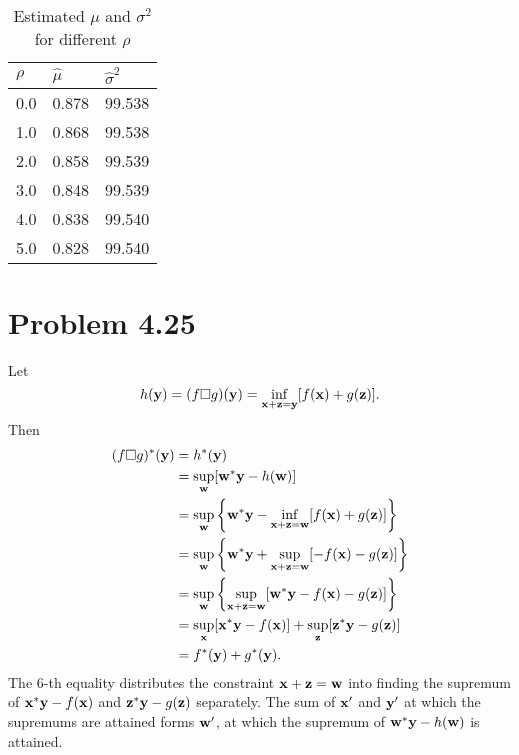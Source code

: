 \documentclass{scrartcl}
\begin{document}
\begin{table}[htb]
        \centering
        \begin{tabular}{| l | l | l |}
                \hline
                $\rho$ & $\hat{\mu}$ & $\hat{\sigma}^2$ \\ \hline
                0.0 & 0.878 & 99.538 \\ \hline
                1.0 & 0.868 & 99.538 \\ \hline
                2.0 & 0.858 & 99.539 \\ \hline
                3.0 & 0.848 & 99.539 \\ \hline
                4.0 & 0.838 & 99.540 \\ \hline
                5.0 & 0.828 & 99.540 \\ \hline
        \end{tabular}
        \caption{Estimated $\mu$ and $\sigma^2$ for different $\rho$}
        \label{tbl:param_est}
\end{table}

\section*{Problem 4.25}

Let 
\begin{equation}
h(\mathbf{y}) = (f \Box g)(\mathbf{y})
= \inf_{\mathbf{x}+\mathbf{z}=\mathbf{y}} [f(\mathbf{x})+g(\mathbf{z})].
\end{equation}
Then
\begin{equation}
	\begin{split}
		(f \Box g)^*(\mathbf{y})
		& = h^*(\mathbf{y}) \\
		& = \sup_{\mathbf{w}} [\mathbf{w}^*\mathbf{y}-h(\mathbf{w})] \\
		& = \sup_{\mathbf{w}} \left\lbrace 
				\mathbf{w}^*\mathbf{y}-\inf_{\mathbf{x}+\mathbf{z}=\mathbf{w}} [f(\mathbf{x})+g(\mathbf{z})]
			\right\rbrace \\
		& = \sup_{\mathbf{w}} \left\lbrace 
				\mathbf{w}^*\mathbf{y}+\sup_{\mathbf{x}+\mathbf{z}=\mathbf{w}} [-f(\mathbf{x})-g(\mathbf{z})]
			\right\rbrace \\
		& = \sup_{\mathbf{w}} \left\lbrace 
				\sup_{\mathbf{x}+\mathbf{z}=\mathbf{w}} [\mathbf{w}^*\mathbf{y}-f(\mathbf{x})-g(\mathbf{z})]
			\right\rbrace \\
		& = \sup_{\mathbf{x}} [\mathbf{x}^*\mathbf{y}-f(\mathbf{x})]
		    + \sup_{\mathbf{z}} [\mathbf{z}^*\mathbf{y}-g(\mathbf{z})] \\
		& = f^*(\mathbf{y})+g^*(\mathbf{y}).
	\end{split}
\end{equation}
The 6-th equality distributes the constraint $\mathbf{x}+\mathbf{z}=\mathbf{w}$
into finding the supremum of $\mathbf{x}^*\mathbf{y}-f(\mathbf{x})$ and $\mathbf{z}^*\mathbf{y}-g(\mathbf{z})$
separately. The sum of $\mathbf{x}'$ and $\mathbf{y}'$ at which the supremums are attained forms
$\mathbf{w}'$, at which the supremum of $\mathbf{w}^*\mathbf{y}-h(\mathbf{w})$ is attained.
\end{document}
